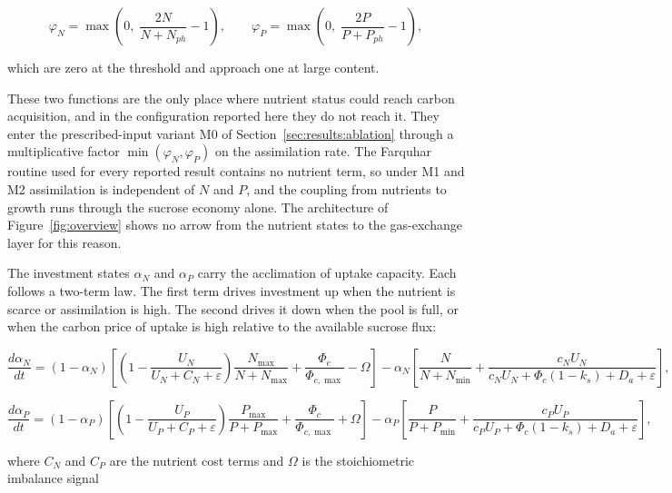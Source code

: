 \begin{equation}
\varphi_N = \max\!\left(0,\; \frac{2N}{N+N_{ph}} - 1\right),
\qquad
\varphi_P = \max\!\left(0,\; \frac{2P}{P+P_{ph}} - 1\right),
\label{eq:nutrient_saturation}
\end{equation}

which are zero at the threshold and approach one at large content.

These two functions are the only place where nutrient status could reach carbon
acquisition, and in the configuration reported here they do not reach it. They
enter the prescribed-input variant M0 of Section~\ref{sec:results:ablation}
through a multiplicative factor $\min(\varphi_N,\varphi_P)$ on the assimilation
rate. The Farquhar routine used for every reported result contains no nutrient
term, so under M1 and M2 assimilation is independent of $N$ and $P$, and the
coupling from nutrients to growth runs through the sucrose economy alone. The
architecture of Figure~\ref{fig:overview} shows no arrow from the nutrient
states to the gas-exchange layer for this reason.

The investment states $\alpha_N$ and $\alpha_P$ carry the acclimation of uptake
capacity. Each follows a two-term law. The first term drives investment up when the
nutrient is scarce or assimilation is high. The second drives it down when the pool
is full, or when the carbon price of uptake is high relative to the available
sucrose flux:

\begin{equation}
\frac{d\alpha_N}{dt}
= \left(1-\alpha_N\right)
\left[
\left(1 - \frac{U_N}{U_N + C_N + \varepsilon}\right)
\frac{N_{\max}}{N + N_{\max}}
+ \frac{\Phi_c}{\Phi_{c,\max}}
- \Omega
\right]
- \alpha_N
\left[
\frac{N}{N+N_{\min}}
+ \frac{c_N U_N}{c_N U_N + \Phi_c\left(1-k_s\right) + D_a + \varepsilon}
\right],
\label{eq:dalphaN}
\end{equation}

\begin{equation}
\frac{d\alpha_P}{dt}
= \left(1-\alpha_P\right)
\left[
\left(1 - \frac{U_P}{U_P + C_P + \varepsilon}\right)
\frac{P_{\max}}{P + P_{\max}}
+ \frac{\Phi_c}{\Phi_{c,\max}}
+ \Omega
\right]
- \alpha_P
\left[
\frac{P}{P+P_{\min}}
+ \frac{c_P U_P}{c_P U_P + \Phi_c\left(1-k_s\right) + D_a + \varepsilon}
\right],
\label{eq:dalphaP}
\end{equation}

where $C_N$ and $C_P$ are the nutrient cost terms and $\Omega$ is the
stoichiometric imbalance signal


